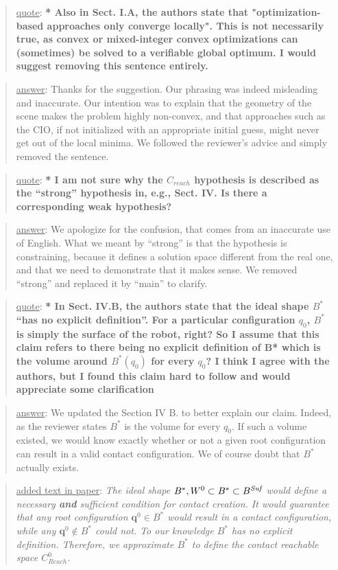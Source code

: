 \documentclass[a4paper]{article}
\newcommand{\done}[0]{}
\newcommand\quot[1]{\begin{quote} \underline{quote}: \textbf{#1}\end{quote}}
\newcommand\as[1]{\begin{quote} \underline{answer}: {#1}\end{quote} }
\newcommand\qt[1]{\begin{quote} \underline{added text in paper}: \textit{#1}\end{quote} \leavevmode \\ }
\begin{document}
\quot{* Also in Sect. I.A, the authors state that "optimization-based
approaches only converge locally". This is not necessarily true, as
convex or mixed-integer convex optimizations can (sometimes) be solved
to a verifiable global optimum. I would suggest removing this sentence
entirely.}
\as{Thanks for the suggestion. Our phrasing was indeed misleading and inaccurate. Our intention was to explain that the geometry of the scene makes the problem highly non-convex, and
that approaches such as the CIO, if not initialized with an appropriate initial guess, might never get out of the local minima. We followed the reviewer's advice and simply removed the sentence. }\done

\quot{* I am not sure why the $C_{reach}$ hypothesis is described as the ``strong''
hypothesis in, e.g., Sect. IV. Is there a corresponding weak
hypothesis?}
\as{We apologize for the confusion, that comes from an inaccurate use of English. What we meant by ``strong'' is that the hypothesis is constraining, because
it defines a solution space different from the real one, and that we need to demonstrate that it makes sense.  We removed ``strong'' and replaced it by ``main'' to clarify. }\done

\quot{* In Sect. IV.B, the authors state that the ideal shape $B^*$ ``has no
explicit definition''. For a particular configuration  $q_0$, $B^*$ is simply
the surface of the robot, right? So I assume that this claim refers to
there being no explicit definition of B* which is the volume around
$B^*(q_0)$ for every $q_0$? I think I agree with the authors, but I found
this claim hard to follow and would appreciate some clarification}
\as{We updated the Section IV B. to better explain our claim. Indeed, as the reviewer states $B^*$  is the volume for every $q_0$. If such a volume existed, we would know exactly whether or not a given root configuration can result in a valid contact configuration.
We of course doubt that $B^*$ actually exists. }
\qt{The ideal shape $B^*, W^0 \subset B^* \subset B^{\textrm{\it Suf}}$ would define a necessary \textbf{and} sufficient condition for contact creation. 
It would guarantee that any root configuration $\mathbf{q}^{0} \in B^*$ would result in a contact configuration, while any $\mathbf{q}^{0} \notin B^*$ could not.
To our knowledge  $B^*$ has no explicit definition.
Therefore, we approximate $B^*$ to define the contact reachable space $C_{Reach}^0$.}\done
\end{document}
